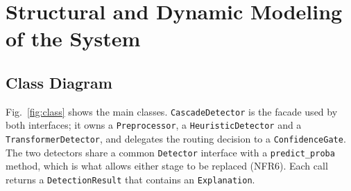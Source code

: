 \section{Structural and Dynamic Modeling of the System}

\subsection{Class Diagram}

Fig.~\ref{fig:class} shows the main classes. \texttt{CascadeDetector} is the
facade used by both interfaces; it owns a \texttt{Preprocessor}, a
\texttt{HeuristicDetector} and a \texttt{TransformerDetector}, and delegates
the routing decision to a \texttt{ConfidenceGate}. The two detectors share a
common \texttt{Detector} interface with a \texttt{predict\_proba} method, which
is what allows either stage to be replaced (NFR6). Each call returns a
\texttt{DetectionResult} that contains an \texttt{Explanation}.

